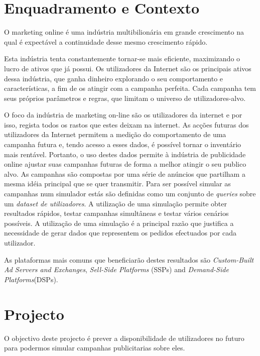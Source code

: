 \documentclass[9pt,a4paper]{extarticle}
\begin{document}
\begin{multicols}{2}

\section{Enquadramento e Contexto} \label{sec:context}


O marketing online é uma indústria multibilionária em grande
crescimento\cite{PricewaterhouseCoopers2013} na qual é expectável a
continuidade desse mesmo crescimento rápido\cite{PricewaterhouseCoopers2013a}.

Esta indústria tenta constantemente tornar-se mais eficiente, maximizando o
lucro de ativos que já possui. Os utilizadores da Internet são os principais
ativos dessa indústria, que ganha dinheiro explorando o seu comportamento e
características, a fim de os atingir com a campanha perfeita. Cada campanha tem
seus próprios parâmetros e regras, que limitam o universo de utilizadores-alvo.

O foco da indústria de marketing on-line são os utilizadores da internet e por
isso, regista todos os rastos que estes deixam na internet. As acções futuras
dos utilizadores da Internet permitem a medição do comportamento de uma
campanha futura e, tendo acesso a esses dados, é possível tornar o inventário
mais rentável. Portanto, o uso destes dados permite à indústria de publicidade
online ajustar suas campanhas futuras de forma a melhor atingir o seu publico
alvo. As campanhas são compostas por uma série de anúncios que partilham a mesma
idéia principal que se quer transmitir. Para ser possível simular as campanhas num
simulador estás são definidas
como um conjunto de \emph{queries} sobre um \emph{dataset de
utilizadores}. A utilização de uma simulação permite obter resultados rápidos,
testar campanhas simultâneas e testar vários cenários possíveis. A utilização
de uma simulação é a principal razão que justifica a necessidade de gerar dados
que representem os pedidos efectuados por cada utilizador.

As plataformas mais comuns que beneficiarão destes resultados são
\emph{Custom-Built Ad Servers and Exchanges}, \emph{Sell-Side Platforms} (SSPs)
and \emph{Demand-Side Platforms}(DSPs).

\section{Projecto} \label{sec:proj}

O objectivo deste projecto é prever a disponibilidade de utilizadores no futuro
para podermos simular campanhas publicitarias sobre eles.


\end{multicols}
\end{document}
